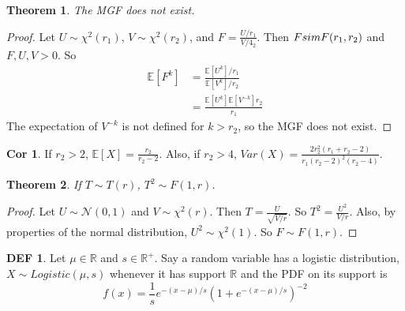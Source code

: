 \documentclass{article}
\newtheorem{theorem}{Theorem}
\theoremstyle{definition}\newtheorem{definition}{DEF}
\theoremstyle{definition}\newtheorem{example}{Ex}
\theoremstyle{lemma}\newtheorem{lemma}{Lemma}
\theoremstyle{corrolary}\newtheorem{corrolary}{Cor}
\begin{document}
\begin{theorem}
The MGF does not exist.
\end{theorem}
\begin{proof}
Let $U\sim \chi^2(r_1)$, $V\sim \chi^2 (r_2)$, and $F=\frac{U/r_1}{V/4_2}$.
Then $F\\sim F(r_1, r_2)$ and $F, U, V>0$.
So
\begin{align*}
\mathbb{E}[F^k] &= \frac{\mathbb{E}[U^k]/r_1}{\mathbb{E}[V^k]/r_2}\\
&= \frac{\mathbb{E}[U^k]\mathbb{E}[V^{-k}]r_2}{r_1}
\end{align*}
The expectation of $V^{-k}$ is not defined for $k>r_2$, so the MGF does not exist.
\end{proof}
\begin{corrolary}
If $r_2 >2$, $\mathbb{E}[X]=\frac{r_2}{r_2 -2}$.
Also, if $r_2 >4$, $Var(X)=\frac{2r_2^2 (r_1 + r_2 -2)}{r_1 (r_2 -2)^2 (r_2 -4)}$.
\end{corrolary}

\begin{theorem}
If $T\sim T(r)$, $T^2 \sim F(1, r)$.
\end{theorem}
\begin{proof}
Let $U\sim \mathcal{N}(0,1)$ and $V\sim \chi^2(r)$.
Then $T=\frac{U}{\sqrt{V/r}}$.
So $T^2=\frac{U^2}{V/r}$.
Also, by properties of the normal distribution,  $U^2\sim \chi^2(1)$.
So $F\sim F(1,r)$.
\end{proof}

\begin{definition}
Let $\mu \in \mathbb{R}$ and $s\in \mathbb{R}^+$.
Say a random variable has a logistic distribution, $X\sim Logistic(\mu, s)$ whenever it has support $\mathbb{R}$ and the PDF on its support is
\begin{equation}
f(x)=\frac{1}{s}e^{-(x-\mu )/s} \left( 1+e^{-(x-\mu )/s}\right)^{-2}
\end{equation}
\end{definition}
\end{document}
